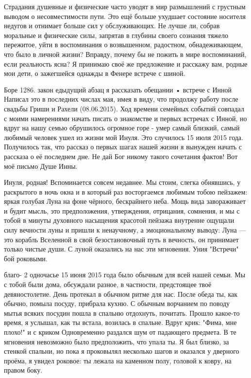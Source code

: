 Страдания душевные и физические часто уводят в мир размышлений с грустным выводом о несовместимости пути. Это ещё больше ухудшает состояние носителя недугов и отнимает больше сил у обслуживающих. Не лучше ли, собрав моральные и физические силы, запрятав в глубины своего сознания тяжело пережитое, уйти в воспоминания о возвышенном, радостном, обнадеживающем, что было в личной жизни? Вправду, почему бы не пожить в мире воспоминаний, если реальность ясна? Я принимаю своё же предложение и расскажу вам, родные мои дети, о зажегшейся однажды в Фенере встрече с шиной.

Боре 1286. закон едыдущий абзац я рассказать обещании • встрече с Инной Написал это в последних числах мая, имея в виду, что продолжу работу после свадьбы Гриши и Рахели (08.06.2015). Ход времени семейных событий совпадал с моими намерениями начать писать о знакомстве и первых встречах с Инной, но вдруг на нашу семью обрушилось огромное горе - умер самый близкий, самый любимый человек ушел из жизни мой Инуля. Это случилось 15 июля 2015 года. Получилось так, что рассказ о первых шагах нашей жизни я вынужден начать с рассказа о её последнем дне. Не дай Бог никому такого сочетания фактов! Вот моё письмо Душе Инны.

Инуля, родная!
Вспоминается совсем недавнее. Мы стоим, слегка обнявшись, у раскрытого в ночь окна и в который раз восторгаемся любимым тобою пейзажем: яркая голубая Луна на фоне чёрного, бескрайнего неба. Мощь вида завораживает и будит мысль, это предположения, утверждения, отрицания, сомнения, и мы с тобой в минуты духовного насыщения красотой пейзажа внутренне ощущали силу вечности луны и пришли к ненаучному, а эмоциональному выводу: Луна — это корабль Вселенной в свой безостановочный путь в вечность, он принимает только чистые души.
С луной оказались на нас эти мгновения. Уния "Встречи" бой роковыми.

благо- 2 одночасье 15 июня 2015 года было обычным для всей нашей семьи. Мы с тобой были дома, обсуждали разное, в частности, предстоящее твоё девяностолетие. День протекал в обычном ритме для нас. После обеда ты, как обычно, помыла посуду, прибрала кухню. С обычным ворчанием по поводу мытья всяких посудин пошла в спальню отдохнуть, почитать. Прошло какое-то время, я услышал, как ты встала, возилась в спальне. Вдруг крик: "Фима, мне плохо!" и с криком Одновременно раздался шум от падающего предмета. В те мгновения невозможно было предположить, что упала ты. Я был близко, за стенкой спальни, но пока я проковылял несколько шагов и оказался у дверного проёма, я увидел роковое: ты лежала на каменном полу, головой к ковру, на правом боку.

